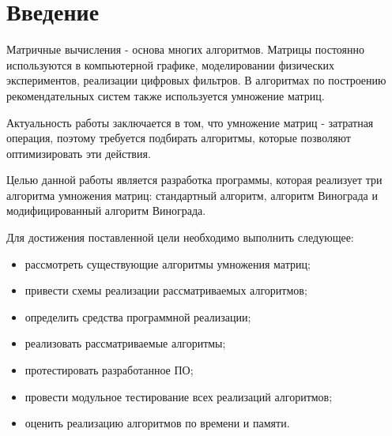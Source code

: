 \newpage
{}

\chapter*{Введение}
Матричные вычисления - основа многих алгоритмов. Матрицы постоянно используются в компьютерной графике,
моделировании физических экспериментов, реализации цифровых фильтров. 
В алгоритмах по построению рекомендательных систем также используется умножение матриц. 

Актуальность работы заключается в том, что умножение матриц - затратная операция, поэтому требуется
подбирать алгоритмы, которые позволяют оптимизировать эти действия.

Целью данной работы является разработка программы, которая реализует три алгоритма умножения матриц:
стандартный алгоритм, алгоритм Винограда и модифицированный алгоритм Винограда.

Для достижения поставленной цели необходимо выполнить следующее:
\begin{itemize}
	\item рассмотреть существующие алгоритмы умножения матриц;
	\item привести схемы реализации рассматриваемых алгоритмов;
	\item определить средства программной реализации;
	\item реализовать рассматриваемые алгоритмы;
	\item протестировать разработанное ПО;
	\item провести модульное тестирование всех реализаций алгоритмов;
	\item оценить реализацию алгоритмов по времени и памяти.
\end{itemize}